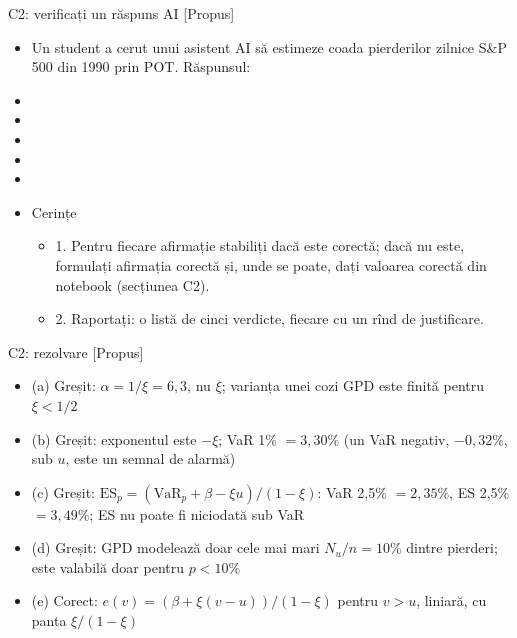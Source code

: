 \begin{frame}{C2: verificați un răspuns AI [Propus]}
\itemsize{\scriptsize}
\begin{itemize}
    \item Un student a cerut unui asistent AI să estimeze coada pierderilor zilnice S\&P 500 din 1990 prin POT. Răspunsul:
    \item {}
    \item {}
    \item {}
    \item {}
    \item {}
    \item Cerințe
    \begin{itemize}
        \item 1. Pentru fiecare afirmație stabiliți dacă este corectă; dacă nu este, formulați afirmația corectă și, unde se poate, dați valoarea corectă din notebook (secțiunea C2).
        \item 2. Raportați: o listă de cinci verdicte, fiecare cu un rînd de justificare.
    \end{itemize}
\end{itemize}
\end{frame}

\ifsolutions
\begin{frame}{C2: rezolvare [Propus]}
\itemsize{\footnotesize}
\begin{itemize}
    \item (a) Greșit: $\alpha = 1/\xi = 6{,}3$, nu $\xi$; varianța unei cozi GPD este finită pentru $\xi < 1/2$
    \item (b) Greșit: exponentul este $-\xi$; VaR 1\% $= 3{,}30\%$ (un VaR negativ, $-0{,}32\%$, sub $u$, este un semnal de alarmă)
    \item (c) Greșit: $\mathrm{ES}_p = (\mathrm{VaR}_p + \beta - \xi u)/(1 - \xi)$: VaR 2,5\% $= 2{,}35\%$, ES 2,5\% $= 3{,}49\%$; ES nu poate fi niciodată sub VaR
    \item (d) Greșit: GPD modelează doar cele mai mari $N_u/n = 10\%$ dintre pierderi; este valabilă doar pentru $p < 10\%$
    \item (e) Corect: $e(v) = (\beta + \xi(v - u))/(1 - \xi)$ pentru $v > u$, liniară, cu panta $\xi/(1 - \xi)$
\end{itemize}
\end{frame}
\fi


